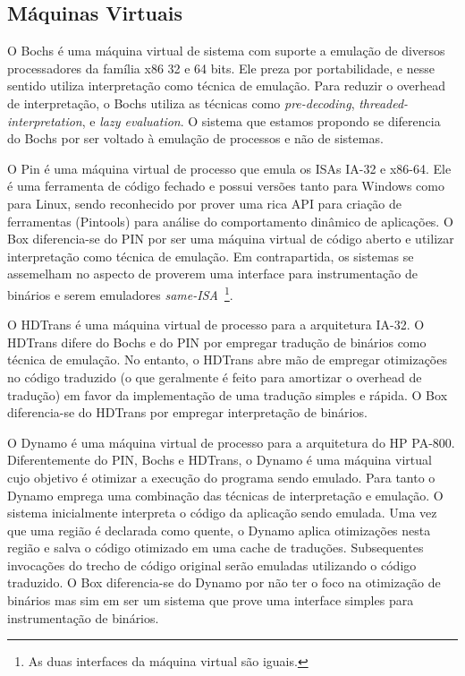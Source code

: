 \documentclass[11pt,twoside]{article}
\begin{document}
\subsection{Máquinas Virtuais}
O Bochs \cite{Lawton1996} é uma máquina virtual de sistema com suporte a emulação de diversos processadores da família x86 32 e 64 bits. 
Ele preza por portabilidade, e nesse sentido utiliza interpretação como técnica de emulação. Para reduzir o overhead de interpretação, o Bochs utiliza as técnicas como \emph{pre-decoding}\cite{Magnusson1994}, \emph{threaded-interpretation}\cite{Klint1981}, e \emph{lazy evaluation}\cite{Hookway1997}.
O sistema que estamos propondo se diferencia do Bochs por ser voltado à emulação de processos e não de sistemas.

O Pin \cite{Luk2005} é uma máquina virtual de processo que emula os ISAs IA-32 e x86-64. 
Ele é uma ferramenta de código fechado e possui versões tanto para Windows como para Linux, sendo reconhecido por prover uma rica API para criação de ferramentas (Pintools) para análise do comportamento dinâmico de aplicações. 
O Box diferencia-se do PIN por ser uma máquina virtual de código aberto e utilizar interpretação como técnica de emulação.
Em contrapartida, os sistemas se assemelham no aspecto de proverem uma interface para instrumentação de binários e serem emuladores \emph{same-ISA}~\footnote{As duas interfaces da máquina virtual são iguais.}.

O HDTrans \cite{Sridhar2006} é uma máquina virtual de processo para a arquitetura IA-32.
O HDTrans difere do Bochs e do PIN por empregar tradução de binários como técnica de emulação.
No entanto, o HDTrans abre mão de empregar otimizações no código traduzido (o que geralmente é feito para amortizar o overhead de tradução) em favor da implementação de uma tradução simples e rápida.
O Box diferencia-se do HDTrans por empregar interpretação de binários.

O Dynamo \cite{Bala2000} é uma máquina virtual de processo para a arquitetura do HP PA-800. 
Diferentemente do PIN, Bochs e HDTrans, o Dynamo é uma máquina virtual cujo objetivo é otimizar a execução do programa sendo emulado.
Para tanto o Dynamo emprega uma combinação das técnicas de interpretação e emulação. 
O sistema inicialmente interpreta o código da aplicação sendo emulada. 
Uma vez que uma região é declarada como quente, o Dynamo aplica otimizações nesta região e salva o código otimizado em uma cache de traduções. 
Subsequentes invocações do trecho de código original serão emuladas utilizando o código traduzido. 
O Box diferencia-se do Dynamo por não ter o foco na otimização de binários mas sim em ser um sistema que prove uma interface simples para 
instrumentação de binários.
\end{document}
